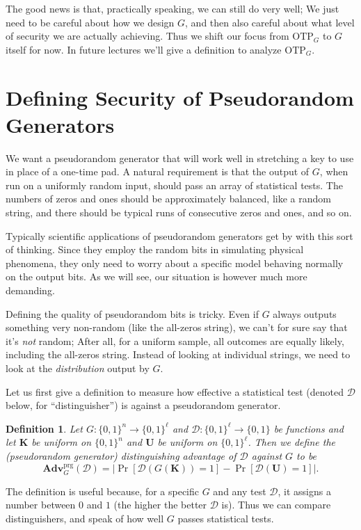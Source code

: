 \documentclass[11pt]{article}
\newtheorem{definition}{Definition}
\newcommand{\calD}{\mathcal{D}}
\newcommand{\Adv}{\mathbf{Adv}}
\newcommand{\AdvPRG}[2]{\Adv^{\mathrm{prg}}_{#1}({#2})}
\newcommand{\bits}{\{0,1\}}
\newcommand{\bK}{\mathbf{K}}
\newcommand{\bU}{\mathbf{U}}
\newcommand{\otp}{\mathrm{OTP}}
\begin{document}
The good news is that, practically speaking, we can still do very well; We just
need to be careful about how we design $G$, and then also careful about what
level of security we are actually achieving. Thus we shift our focus from
$\otp_G$ to $G$ itself for now. In future lectures we'll give a definition to
analyze $\otp_G$.

\section{Defining Security of Pseudorandom Generators}

We want a pseudorandom generator that will work well in stretching a key to use
in place of a one-time pad. A natural requirement is that the output of $G$,
when run on a uniformly random input, should pass an array of statistical
tests. The numbers of zeros and ones should be approximately balanced, like a
random string, and there should be typical runs of consecutive zeros and ones,
and so on.

Typically scientific applications of pseudorandom generators get by with this
sort of thinking. Since they employ the random bits in simulating physical
phenomena, they only need to worry about a specific model behaving normally
on the output bits.
As we will see, our situation is however much more demanding. 

Defining the quality of pseudorandom bits is tricky. Even if $G$ always
outputs something very non-random (like the all-zeros string), we can't
for sure say that it's \emph{not} random; After all, for a uniform sample,
all outcomes are equally likely, including the all-zeros string.
Instead of looking at individual strings, we need to look at the
\emph{distribution} output by $G$.

Let us first give a definition to measure how effective a statistical test
(denoted $\calD$ below, for ``distinguisher'') is against a pseudorandom
generator.
\begin{definition}
    Let $G:\bits^n\to\bits^\ell$ and $\calD:\bits^\ell \to \bits$ be functions
    and let $\bK$ be uniform on $\bits^n$ and $\bU$ be uniform on $\bits^\ell$.
    Then we define the \emph{(pseudorandom generator) distinguishing advantage
    of $\calD$ against $G$} to be
    \[
        \AdvPRG{G}{\calD} =
        \left|\Pr[\calD(G(\bK))=1]-\Pr[\calD(\bU)=1]\right|.
    \]
\end{definition}
The definition is useful because, for a specific $G$ and any test $\calD$, it
assigns a number between $0$ and $1$ (the higher the better $\calD$ is).
Thus we can compare distinguishers, and speak of how well $G$ passes
statistical tests.
\end{document}

